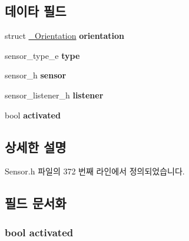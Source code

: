 \subsection*{데이타 필드}
\begin{DoxyCompactItemize}
\item 
\hypertarget{struct__OrientationExtend_ad28b7e9f0c184d60aba7731570671894}{struct \hyperlink{struct__Orientation}{\-\_\-\-Orientation} {\bfseries orientation}}\label{struct__OrientationExtend_ad28b7e9f0c184d60aba7731570671894}

\item 
\hypertarget{struct__OrientationExtend_abffb09766da2fc510a79bb51f82a36e1}{sensor\-\_\-type\-\_\-e {\bfseries type}}\label{struct__OrientationExtend_abffb09766da2fc510a79bb51f82a36e1}

\item 
\hypertarget{struct__OrientationExtend_a5bae9b7801bc3808411925cde81d3f26}{sensor\-\_\-h {\bfseries sensor}}\label{struct__OrientationExtend_a5bae9b7801bc3808411925cde81d3f26}

\item 
\hypertarget{struct__OrientationExtend_aa977dfb866b24fd7d9a20a9a01b2fd1f}{sensor\-\_\-listener\-\_\-h {\bfseries listener}}\label{struct__OrientationExtend_aa977dfb866b24fd7d9a20a9a01b2fd1f}

\item 
\hypertarget{struct__OrientationExtend_a73e9fa0c3543560192f38a8ab6a78c47}{bool {\bfseries activated}}\label{struct__OrientationExtend_a73e9fa0c3543560192f38a8ab6a78c47}

\end{DoxyCompactItemize}


\subsection{상세한 설명}


Sensor.\-h 파일의 372 번째 라인에서 정의되었습니다.



\subsection{필드 문서화}
\hypertarget{struct__OrientationExtend_a73e9fa0c3543560192f38a8ab6a78c47}{
\subsubsection[{activated}]{\setlength{\rightskip}{0pt plus 5cm}bool activated}}\label{struct__OrientationExtend_a73e9fa0c3543560192f38a8ab6a78c47}


